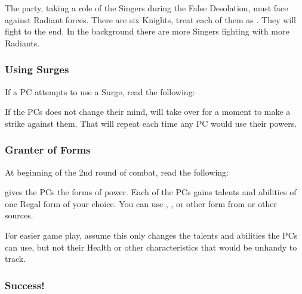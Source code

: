 The party, taking a role of the Singers during the False Desolation, must face against Radiant forces. There are six Knights, treat each of them as \enemyWindrunnerThird{}. They will fight to the end. In the background there are more Singers fighting with more Radiants.

\subsubsection{Using Surges}

If a PC attempts to use a Surge, read the following:


If the PCs does not change their mind, \enemyMishram{} will take over \npcMishram{} for a moment to make a strike against them. That will repeat each time any PC would use their powers.

\subsubsection{Granter of Forms}

At beginning of the 2nd round of combat, read the following:


\npcMishram{} gives the PCs the forms of power. Each of the PCs gains talents and abilities of one Regal form of your choice. You can use \enemySingerDireform{}, \enemySingerStormform{}, or other form from \handbook{} or other sources.

For easier game play, assume this only changes the talents and abilities the PCs can use, but not their Health or other characteristics that would be unhandy to track.


\subsubsection{Success!}


